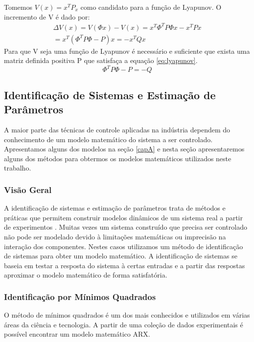 Tomemos $V(x)=x^TP_x$ como candidato para a função de Lyapunov. O incremento de V é dado por:
\begin{equation}
\begin{array}{c}
\Delta V(x)=V(\Phi x)-V(x)=x^T\Phi ^T P \Phi x-x^TPx\\
=x^T(\Phi ^T P \Phi -P)x=-x^TQx
\end{array}
\end{equation}
Para que V seja uma função de Lyapunov é necessário e suficiente que exista uma matriz definida positiva P que satisfaça a equação \eqref{eq:lyapunov}.
\begin{equation}\label{eq:lyapunov}
\Phi ^T P \Phi - P= -Q
\end{equation}






\subsection{Identificação de Sistemas e Estimação de Parâmetros}
A maior parte das técnicas de controle aplicadas na indústria dependem do conhecimento de um modelo matemático do sistema a ser controlado. Apresentamos alguns dos modelos na seção \ref{capA} e nesta seção apresentaremos alguns dos métodos para obtermos os modelos matemáticos utilizados neste trabalho.


\subsubsection{Visão Geral}
A identificação de sistemas e estimação de parâmetros trata de métodos e práticas que permitem construir modelos dinâmicos de um sistema real a partir de experimentos . Muitas vezes um sistema construído que precisa ser controlado não pode ser modelado devido à limitações matemáticas ou imprecisão na interação dos componentes. Nestes casos utilizamos um método de identificação de sistemas para obter um modelo matemático. A identificação de sistemas se baseia em testar a resposta do sistema à certas entradas e a partir das respostas aproximar o modelo matemático de forma satisfatória.


\subsubsection{Identificação por Mínimos Quadrados}
O método de mínimos quadrados é um dos mais conhecidos e utilizados em várias áreas da ciência e tecnologia. A partir de uma coleção de dados experimentais é possível encontrar um modelo matemático ARX.


